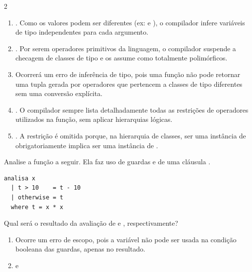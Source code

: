 \documentclass[a4paper,10pt,brazil]{article}
\begin{document}
\begin{multicols}{2}
\begin{enumerate}
  \item {}. Como os valores podem ser diferentes (ex:  e ), o compilador infere variáveis de tipo independentes para cada argumento.

  \item {}. Por serem operadores primitivos da linguagem, o compilador suspende a checagem de classes de tipo e os assume como totalmente polimórficos.

  \item Ocorrerá um erro de inferência de tipo, pois uma função não pode retornar uma tupla gerada por operadores que pertencem a classes de tipo diferentes sem uma conversão explícita.

  \item {}. O compilador sempre lista detalhadamente todas as restrições de operadores utilizados na função, sem aplicar hierarquias lógicas.

  \item {}. A restrição  é omitida porque, na hierarquia de classes, ser uma instância de  obrigatoriamente implica ser uma instância de .


\end{enumerate}

Analise a função a seguir. Ela faz uso de guardas e de uma cláusula .

\begin{verbatim}
analisa x
  | t > 10    = t - 10
  | otherwise = t
  where t = x * x
\end{verbatim}

Qual será o resultado da avaliação de  e , respectivamente?

\begin{enumerate}
  \item Ocorre um erro de escopo, pois a variável  não pode ser usada na condição booleana das guardas, apenas no resultado.

  \item {} e 


\end{enumerate}
\end{multicols}
\end{document}
